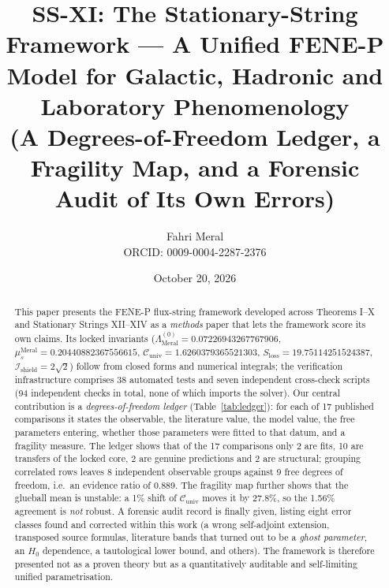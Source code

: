 \documentclass[12pt,a4paper]{article}
\title{\textbf{SS-XI: The Stationary-String Framework --- A Unified FENE-P Model for Galactic, Hadronic and Laboratory Phenomenology} \\[0.3cm]
\large (A Degrees-of-Freedom Ledger, a Fragility Map, and a Forensic Audit of Its Own Errors)}
\author{Fahri Meral\\[0.2em]\small ORCID: 0009-0004-2287-2376}
\date{October 20, 2026}
\begin{document}
\maketitle

\begin{abstract}
This paper presents the FENE-P flux-string framework developed across
Theorems I--X and Stationary Strings XII--XIV as a \emph{methods} paper that lets the
framework score its own claims. Its locked invariants
($\Lambda_{\mathrm{Meral}}^{(0)} = 0.07226943267767906$,
$\mu_s^{\mathrm{Meral}} = 0.20440882367556615$,
$\mathcal{C}_{\mathrm{univ}} = 1.6260379365521303$,
$S_{\mathrm{loss}} = 19.75114251524387$,
$\mathcal{I}_{\mathrm{shield}} = 2\sqrt{2}$) follow from closed forms and
numerical integrals; the verification infrastructure comprises 38 automated
tests and seven independent cross-check scripts (94 independent checks in
total, none of which imports the solver). Our central contribution is a
\emph{degrees-of-freedom ledger} (Table~\ref{tab:ledger}): for each of 17
published comparisons it states the observable, the literature value, the
model value, the free parameters entering, whether those parameters were
fitted to that datum, and a fragility measure. The ledger shows that of the
17 comparisons only 2 are fits, 10 are transfers of the locked core, 2 are
genuine predictions and 2 are structural; grouping correlated rows leaves 8
independent observable groups against 9 free degrees of freedom, i.e.\ an
evidence ratio of 0.889. The fragility map further shows that the glueball
mean is unstable: a 1\% shift of $\mathcal{C}_{\mathrm{univ}}$ moves it by
27.8\%, so the 1.56\% agreement is \emph{not} robust. A forensic audit
record is finally given, listing eight error classes found and corrected
within this work (a wrong self-adjoint extension, transposed source
formulas, literature bands that turned out to be a \emph{ghost parameter},
an $H_0$ dependence, a tautological lower bound, and others). The framework
is therefore presented not as a proven theory but as a quantitatively
auditable and self-limiting unified parametrisation.
\end{abstract}
\end{document}

